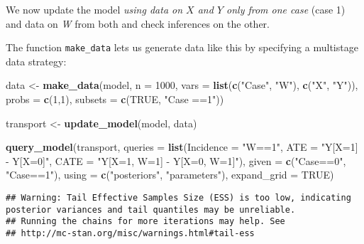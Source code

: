 \documentclass[
  12pt,
]{book}
\newenvironment{Shaded}{\begin{snugshade}}{\end{snugshade}}
\newcommand{\DataTypeTok}[1]{\textcolor[rgb]{0.13,0.29,0.53}{#1}}
\newcommand{\DecValTok}[1]{\textcolor[rgb]{0.00,0.00,0.81}{#1}}
\newcommand{\KeywordTok}[1]{\textcolor[rgb]{0.13,0.29,0.53}{\textbf{#1}}}
\newcommand{\NormalTok}[1]{#1}
\newcommand{\OtherTok}[1]{\textcolor[rgb]{0.56,0.35,0.01}{#1}}
\newcommand{\StringTok}[1]{\textcolor[rgb]{0.31,0.60,0.02}{#1}}
\begin{document}
We now update the model \emph{using data on \(X\) and \(Y\) only from one case} (case 1) and data on \emph{W} from both and check inferences on the other.

The function \texttt{make\_data} lets us generate data like this by specifying a multistage data strategy:

\begin{Shaded}
\begin{Highlighting}[]
\NormalTok{data <-}\StringTok{ }\KeywordTok{make_data}\NormalTok{(model, }\DataTypeTok{n =} \DecValTok{1000}\NormalTok{, }
                  \DataTypeTok{vars =} \KeywordTok{list}\NormalTok{(}\KeywordTok{c}\NormalTok{(}\StringTok{"Case"}\NormalTok{, }\StringTok{"W"}\NormalTok{), }\KeywordTok{c}\NormalTok{(}\StringTok{"X"}\NormalTok{, }\StringTok{"Y"}\NormalTok{)), }
                  \DataTypeTok{probs =} \KeywordTok{c}\NormalTok{(}\DecValTok{1}\NormalTok{,}\DecValTok{1}\NormalTok{),}
                  \DataTypeTok{subsets =} \KeywordTok{c}\NormalTok{(}\OtherTok{TRUE}\NormalTok{, }\StringTok{"Case ==1"}\NormalTok{))}

\NormalTok{transport <-}\StringTok{ }\KeywordTok{update_model}\NormalTok{(model, data)}

\KeywordTok{query_model}\NormalTok{(transport,}
            \DataTypeTok{queries =} \KeywordTok{list}\NormalTok{(}\DataTypeTok{Incidence =} \StringTok{"W==1"}\NormalTok{, }
                           \DataTypeTok{ATE =} \StringTok{"Y[X=1] - Y[X=0]"}\NormalTok{, }
                           \DataTypeTok{CATE =} \StringTok{"Y[X=1, W=1] - Y[X=0, W=1]"}\NormalTok{),}
            \DataTypeTok{given =} \KeywordTok{c}\NormalTok{(}\StringTok{"Case==0"}\NormalTok{, }\StringTok{"Case==1"}\NormalTok{),}
            \DataTypeTok{using =} \KeywordTok{c}\NormalTok{(}\StringTok{"posteriors"}\NormalTok{, }\StringTok{"parameters"}\NormalTok{), }\DataTypeTok{expand_grid =} \OtherTok{TRUE}\NormalTok{)}
\end{Highlighting}
\end{Shaded}

\begin{verbatim}
## Warning: Tail Effective Samples Size (ESS) is too low, indicating posterior variances and tail quantiles may be unreliable.
## Running the chains for more iterations may help. See
## http://mc-stan.org/misc/warnings.html#tail-ess
\end{verbatim}
\end{document}
